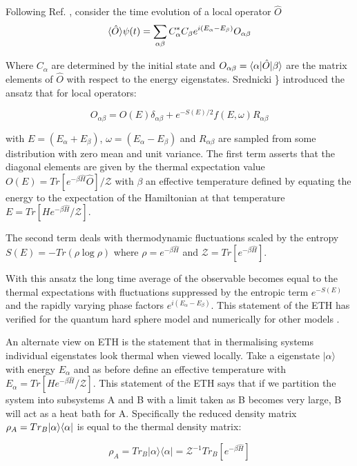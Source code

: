 Following Ref. \textcite{abanin_recent_2017}, consider the time
evolution of a local operator \(\hat{O}\)
\[ \langle \hat{O} \rangle{\psi(t)} = \sum_{\alpha \beta} C^*_\alpha C_\beta e^{i(E_\alpha - E_\beta)} O_{\alpha \beta}\]

Where \(C_\alpha\) are determined by the initial state and
\(O_{\alpha \beta} = \langle \alpha | \hat{O} | \beta \rangle\) are the matrix
elements of \(\hat{O}\) with respect to the energy eigenstates.
Srednicki \textcite{srednicki_chaos_1994}\} introduced the ansatz that
for local operators:

\[O_{\alpha \beta} = O(E)\delta_{\alpha\beta} + e^{-S(E)/2} f(E,\omega) R_{\alpha\beta}\]

with \(E = (E_\alpha + E_\beta)\), \(\omega = (E_\alpha - E_\beta)\) and
\(R_{\alpha\beta}\) are sampled from some distribution with zero mean
and unit variance. The first term asserts that the diagonal elements are
given by the thermal expectation value
\(O(E) = Tr[e^{-\beta \hat{H}} \hat{O}]/\mathcal{Z}\) with \(\beta\) an
effective temperature defined by equating the energy to the expectation
of the Hamiltonian at that temperature
\(E = Tr[H e^{-\beta \hat{H}}/\mathcal{Z}]\).

The second term deals with thermodynamic fluctuations scaled by the
entropy \(S(E) = -Tr(\rho \log \rho)\) where
\(\rho = e^{-\beta \hat{H}}\) and
\(\mathcal{Z} = Tr[e^{-\beta \hat{H}}]\).

With this ansatz the long time average of the observable becomes equal
to the thermal expectations with fluctuations suppressed by the entropic
term \(e^{-S(E)}\) and the rapidly varying phase factors
\(e^{i(E_\alpha - E_\beta)}\). This statement of the ETH has verified
for the quantum hard sphere model \textcite{srednicki_chaos_1994} and
numerically for other models
\autocite{khatami_fluctuation-dissipation_2013,dalessio_quantum_2016}.

An alternate view on ETH is the statement that in thermalising systems
individual eigenstates look thermal when viewed locally. Take a
eigenstate \(|\alpha\rangle\) with energy \(E_\alpha\) and as before
define an effective temperature with
\(E_\alpha = Tr[H e^{-\beta \hat{H}}/\mathcal{Z}]\). This statement of
the ETH says that if we partition the system into subsystems A and B
with a limit taken as B becomes very large, B will act as a heat bath
for A. Specifically the reduced density matrix
\(\rho_A = Tr_B |\alpha\rangle \langle\alpha|\) is equal to the thermal density
matrix:

\[\rho_A = Tr_B |\alpha\rangle \langle \alpha| = \mathcal{Z}^{-1} Tr_B [e^{-\beta \hat{H}}] \]

